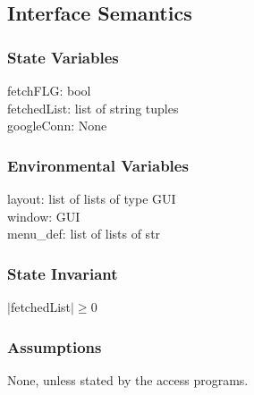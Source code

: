 \documentclass[12pt, titlepage]{article}
\begin{document}
\subsection{Interface Semantics}
\subsubsection{State Variables}
fetchFLG: bool\\
fetchedList: list of string tuples\\
googleConn: None
\subsubsection{Environmental Variables}
layout: list of lists of type GUI\\
window: GUI\\
menu\_def: list of lists of str
\subsubsection{State Invariant}
$|$fetchedList$| \ge 0$
\subsubsection{Assumptions}
None, unless stated by the access programs.
\end{document}
